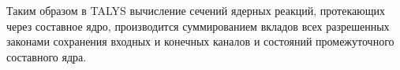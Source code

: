 Таким образом в TALYS вычисление сечений ядерных реакций, протекающих через составное ядро, производится суммированием вкладов всех разрешенных законами сохранения входных и конечных каналов и состояний промежуточного составного ядра.

